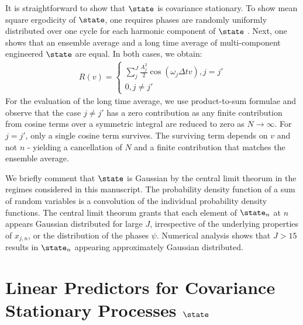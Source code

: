 It is straightforward to show that $\state$ is covariance stationary. To show mean square ergodicity of $\state$, one requires phases are randomly uniformly distributed over one cycle for each harmonic component of $\state$ \cite{gelb1974applied}. Next, one shows that an ensemble average and a long time average of multi-component engineered $\state$ are equal. In both cases, we obtain:
\begin{align}
R(v) = \begin{cases} \sum_j^J \frac{A_j^2}{2} \cos(\omega_j \Delta t v), j = j' \\ 0, j \neq j'
\end{cases}
\end{align} For the evaluation of the long time average, we use product-to-sum formulae and observe that the case $j\neq j'$ has a zero contribution as any finite contribution from cosine terms over a symmetric integral are reduced to zero as $N \rightarrow \infty $.  For $j = j'$, only a single cosine term survives. The surviving term depends on $v$ and not $n$ - yielding a cancellation of $N$ and a finite contribution that matches the ensemble average.

We briefly comment that $\state$ is Gaussian by the central limit theorum in the regimes considered in this manuscript. The probability density function of a sum of random variables is a convolution of the individual probability density functions. The central limit theorum grants that each element of $\state_n$ at $n$ appears Gaussian distributed for large $J$, irrespective of the underlying properties of $x_{j,n}$, or the distribution of the phases $\psi$. Numerical analysis shows that $J > 15$ results in $\state_n$ appearing approximately Gaussian distributed. 


\section{Linear Predictors for Covariance Stationary Processes $\state$ \label{sec:app:predictors}}


